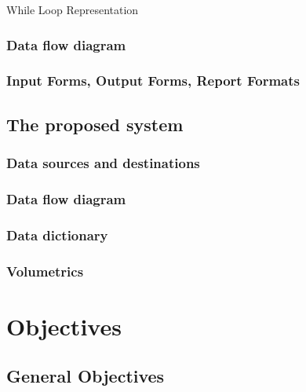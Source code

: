 \begin{algorithm}[H]
    \caption{While Loop Representation}
\begin{algorithmic}[1]
\State
{}
    \EndIf
\EndWhile
\end{algorithmic}
\end{algorithm}

\subsubsection{Data flow diagram}

\subsubsection{Input Forms, Output Forms, Report Formats}

\subsection{The proposed system}

\subsubsection{Data sources and destinations}

\subsubsection{Data flow diagram}

\subsubsection{Data dictionary}

\subsubsection{Volumetrics}

\section{Objectives}

\subsection{General Objectives}

